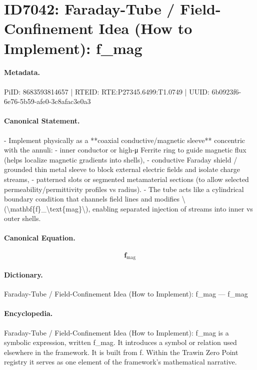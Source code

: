\section*{ID7042: Faraday-Tube / Field-Confinement Idea (How to Implement): f\_mag}
\paragraph{Metadata.}
PiID: 8683593814657 | RTEID: RTE:P27345.6499:T1.0749 | UUID: 6b0923f6-6e76-5b59-afe0-3c8afac3e0a3

\paragraph{Canonical Statement.}
- Implement physically as a **coaxial conductive/magnetic sleeve** concentric with the annuli: - inner conductor or high-μ Ferrite ring to guide magnetic flux (helps localize magnetic gradients into shells), - conductive Faraday shield / grounded thin metal sleeve to block external electric fields and isolate charge streams, - patterned slots or segmented metamaterial sections (to allow selected permeability/permittivity profiles vs radius). - The tube acts like a cylindrical boundary condition that channels field lines and modifies \textbackslash{}(\textbackslash{}mathbf\{f\}\_\textbackslash{}text\{mag\}\textbackslash{}), enabling separated injection of streams into inner vs outer shells.

\paragraph{Canonical Equation.}
\[
\mathbf{f}_\text{mag}
\]

\paragraph{Dictionary.}
Faraday-Tube / Field-Confinement Idea (How to Implement): f\_mag — f\_mag

\paragraph{Encyclopedia.}
Faraday-Tube / Field-Confinement Idea (How to Implement): f\_mag is a symbolic expression, written f\_mag. It introduces a symbol or relation used elsewhere in the framework. It is built from f. Within the Trawin Zero Point registry it serves as one element of the framework's mathematical narrative.
